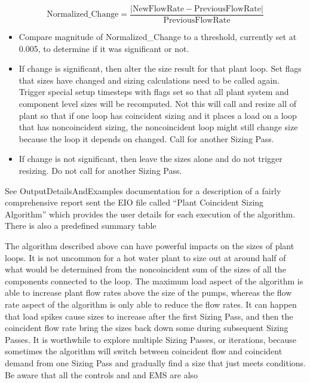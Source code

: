 \begin{equation}
  \text{Normalized\_Change} = \frac{\left|\text{NewFlowRate}-\text{PreviousFlowRate}\right|}{\text{PreviousFlowRate}}
\end{equation}

\begin{itemize}
  \item
    Compare magnitude of Normalized\_Change to a threshold, currently set at 0.005, to determine if it was significant or not.
  \item
    If change is significant, then alter the size result for that plant loop. Set flags that sizes have changed and sizing calculations need to be called again. Trigger special setup timesteps with flags set so that all plant system and component level sizes will be recomputed. Not this will call and resize all of plant so that if one loop has coincident sizing and it places a load on a loop that has noncoincident sizing, the noncoincident loop might still change size because the loop it depends on changed. Call for another Sizing Pass.
  \item
    If change is not significant, then leave the sizes alone and do not trigger resizing. Do not call for another Sizing Pass.
\end{itemize}

See OutputDetailsAndExamples documentation for a description of a fairly comprehensive report sent the EIO file called ``Plant Coincident Sizing Algorithm'' which provides the user details for each execution of the algorithm. There is also a predefined summary table

The algorithm described above can have powerful impacts on the sizes of plant loops. It is not uncommon for a hot water plant to size out at around half of what would be determined from the noncoincident sum of the sizes of all the components connected to the loop. The maximum load aspect of the algorithm is able to increase plant flow rates above the size of the pumps, whereas the flow rate aspect of the algorithm is only able to reduce the flow rates. It can happen that load spikes cause sizes to increase after the first Sizing Pass, and then the coincident flow rate bring the sizes back down some during subsequent Sizing Passes. It is worthwhile to explore multiple Sizing Passes, or iterations, because sometimes the algorithm will switch between coincident flow and coincident demand from one Sizing Pass and gradually find a size that just meets conditions. Be aware that all the controls and and EMS are also
